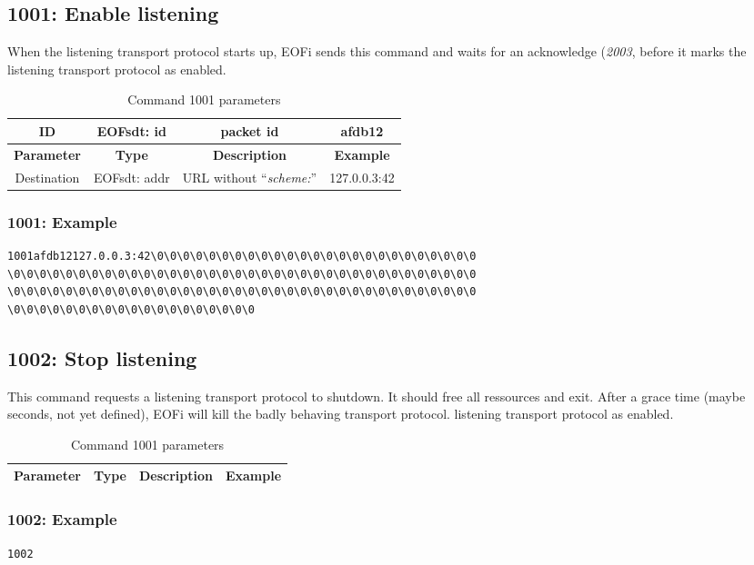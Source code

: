 \documentclass[12pt,a4paper]{book}
\begin{document}
\subsection{1001: Enable listening}
%
When the listening transport protocol starts up, EOFi sends this command and
waits for an acknowledge (\emph{2003}, before it marks the
listening transport protocol as enabled.
\begin{longtable}{|c|c|c|c|}
\caption{Command 1001 parameters}\\
\hline
ID & EOFsdt: id & packet id & afdb12\\
\hline
\textbf{Parameter} & \textbf{Type} & \textbf{Description} & \textbf{Example}\\
\hline
Destination & EOFsdt: addr & URL without "`\emph{scheme:}"' & 127.0.0.3:42\\
\hline
\end{longtable}
\subsubsection{1001: Example}
\begin{verbatim}
1001afdb12127.0.0.3:42\0\0\0\0\0\0\0\0\0\0\0\0\0\0\0\0\0\0\0\0\0\0\0\0\0
\0\0\0\0\0\0\0\0\0\0\0\0\0\0\0\0\0\0\0\0\0\0\0\0\0\0\0\0\0\0\0\0\0\0\0\0
\0\0\0\0\0\0\0\0\0\0\0\0\0\0\0\0\0\0\0\0\0\0\0\0\0\0\0\0\0\0\0\0\0\0\0\0
\0\0\0\0\0\0\0\0\0\0\0\0\0\0\0\0\0\0\0
\end{verbatim}
\subsection{1002: Stop listening}
%
This command requests a listening transport protocol to 
shutdown. It should free all ressources and exit.
After a grace time (maybe seconds, not yet defined), EOFi will kill the badly
behaving transport protocol.
listening transport protocol as enabled.
\begin{longtable}{|c|c|c|c|}
\caption{Command 1001 parameters}\\
\hline
\textbf{Parameter} & \textbf{Type} & \textbf{Description} & \textbf{Example}\\
\hline
\end{longtable}
\subsubsection{1002: Example}
\begin{verbatim}
1002
\end{verbatim}
\end{document}
